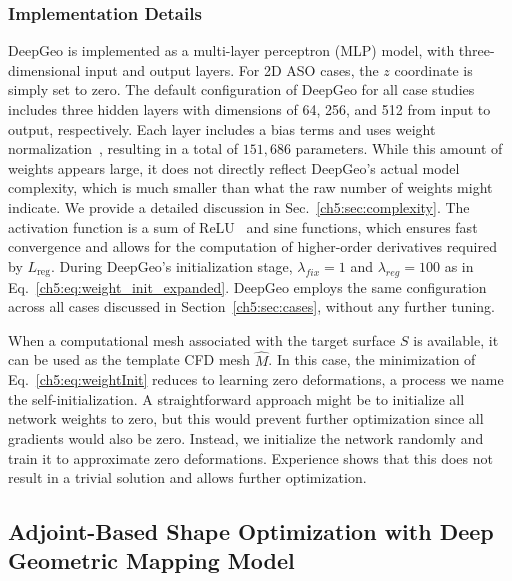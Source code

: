 

\subsubsection{Implementation Details}
\label{ch5:sec:implement}

DeepGeo is implemented as a multi-layer perceptron (MLP) model, with three-dimensional input and output layers.
For 2D ASO cases, the $z$ coordinate is simply set to zero.
The default configuration of DeepGeo for all case studies includes three hidden layers with dimensions of 64, 256, and 512 from input to output, respectively.
Each layer includes a bias terms and uses weight normalization~\cite{ai.Salimans2016b}, resulting in a total of $151,686$ parameters. 
While this amount of weights appears large, it does not directly reflect DeepGeo’s actual model complexity, which is much smaller than what the raw number of weights might indicate. We provide a detailed discussion in Sec.~\ref{ch5:sec:complexity}.
The activation function is a sum of ReLU~\cite{ai.Fukushima1969} and sine functions, which ensures fast convergence and allows for the computation of higher-order derivatives required by $L_\text{reg}$.
During DeepGeo's initialization stage, $\lambda_{fix}=1$ and $\lambda_{reg}=100$ as in Eq.~\ref{ch5:eq:weight_init_expanded}.
DeepGeo employs the same configuration across all cases discussed in Section~\ref{ch5:sec:cases}, without any further tuning.

When a computational mesh associated with the target surface $S$ is available, it can be used as the template CFD mesh $\hat{M}$. 
In this case, the minimization of Eq.~\ref{ch5:eq:weightInit} reduces to learning zero deformations, a process we name the self-initialization. 
A straightforward approach might be to initialize all network weights to zero, but this would prevent further optimization since all gradients would also be zero. Instead, we initialize the network randomly and train it to approximate zero deformations. Experience shows that this does not result in a trivial solution and allows further optimization.



\subsection{Adjoint-Based Shape Optimization with Deep Geometric Mapping Model}
\label{ch5:sec:adj}

